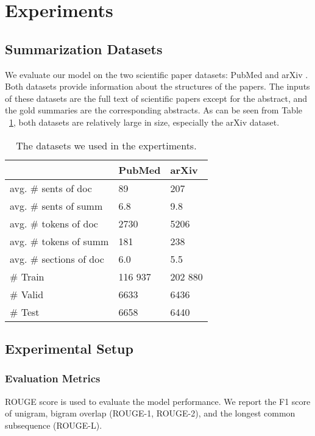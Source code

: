 \documentclass[11pt,a4paper]{article}
\begin{document}
\section{Experiments}
\label{sec:exp}


\subsection{Summarization Datasets}
We evaluate our model on the two scientific paper datasets: PubMed and arXiv  \cite{pubmedarxiv_2018}.
Both datasets provide information about the structures of the papers.
The inputs of these datasets are the full text of scientific papers except for the abstract, and the gold summaries are the corresponding abstracts.
As can be seen from Table ~\ref{tab:dataset}, both datasets are relatively large in size, especially the arXiv dataset.


\begin{table}[h]
  \centering
  \begin{tabular}{l|p{12mm}p{12mm}}\toprule
                                & PubMed    &   arXiv       \\ \midrule
     avg. \# sents of doc        & 89        &   207         \\
     avg. \# sents of summ       & 6.8         &   9.8          \\
     avg. \# tokens of doc       & 2730      &   5206        \\
     avg. \# tokens of summ      & 181       &   238         \\
     avg. \# sections of doc     & 6.0      &   5.5         \\\midrule
     \# Train                   & 116 937   &   202 880      \\
     \# Valid                   & 6633      &   6436        \\
     \# Test                    & 6658      &   6440        \\
     \bottomrule
\end{tabular}
\caption{The datasets we used in the expertiments.}\label{tab:dataset}
\end{table}
 
\subsection{Experimental Setup}

\subsubsection{Evaluation Metrics}
ROUGE score \cite{rouge_2004} is used to evaluate the model performance.
We report the F1 score of unigram, bigram overlap (ROUGE-1, ROUGE-2), and the longest common subsequence (ROUGE-L).
\end{document}
